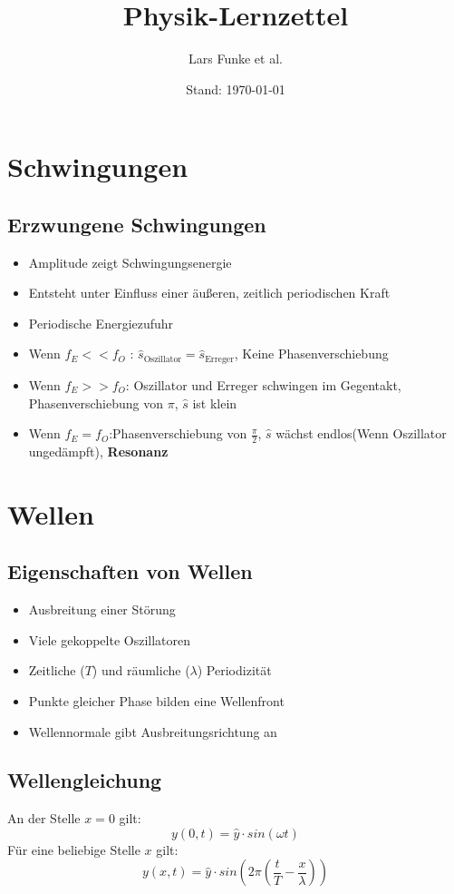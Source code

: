 \documentclass[12pt,a4paper,titlepage]{article}
\title{Physik-Lernzettel}
\author{Lars Funke et al.}
\date{Stand: \today}
\begin{document}
	\maketitle
	\tableofcontents
	\pagebreak
	\section{Schwingungen}
		\subsection{Erzwungene Schwingungen}
			\begin{itemize}
				\item Amplitude zeigt Schwingungsenergie
				\item Entsteht unter Einfluss einer äußeren, zeitlich periodischen Kraft
				\item Periodische Energiezufuhr 
				\item Wenn {\boldmath $ f_{E} << f_{O}$} : $\hat{s}_{\mathrm{Oszillator}}=\hat{s}_{\mathrm{Erreger}} $, Keine Phasenverschiebung 
				\item Wenn  {\boldmath $f_{E} >> f_{O} $}: Oszillator und Erreger schwingen im Gegentakt, Phasenverschiebung von $\pi$, $\hat{s}$ ist klein
				\item Wenn {\boldmath $f_{E} = f_{O} $}:Phasenverschiebung von $\frac{\pi}{2}$, $\hat{s}$ wächst endlos(Wenn Oszillator ungedämpft), \textbf{Resonanz}
				
			\end{itemize}
	\section{Wellen}
		\subsection{Eigenschaften von Wellen}
			\begin{itemize}
				\item Ausbreitung einer Störung
				\item Viele gekoppelte Oszillatoren
				\item Zeitliche ($T$) und räumliche ($\lambda$) Periodizität
				\item Punkte gleicher Phase bilden eine Wellenfront
				\item Wellennormale gibt Ausbreitungsrichtung an
			\end{itemize} 
		\subsection{Wellengleichung}
			An der Stelle $x = 0$ gilt:  
			$$ y(0,t) = \hat{y} \cdot sin(\omega t)$$
			Für eine beliebige Stelle $x$ gilt:  
			$$ y(x,t) = \hat{y} \cdot sin \left( 2 \pi \left( \frac{t}{T} - \frac{x}{\lambda} \right) \right) $$
\end{document}

